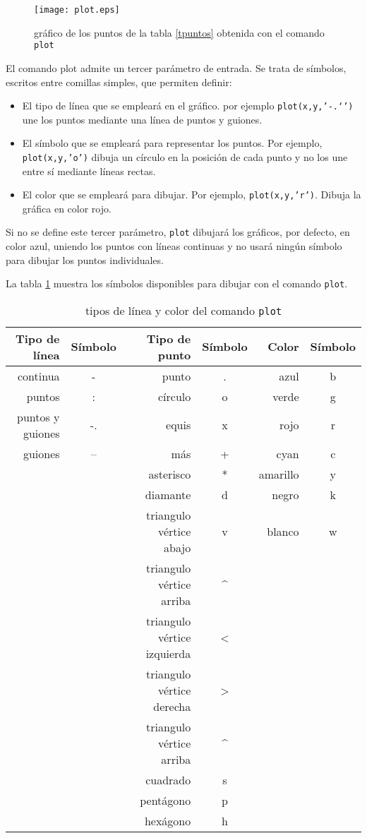 \begin{figure}[h]
\centering
\texttt{[image: plot.eps]}
\caption{gráfico de los puntos de la tabla \ref{tpuntos} obtenida con el comando \texttt{plot}}
\label{fig:plot}
\end{figure}
El comando plot admite un tercer parámetro de entrada. Se trata de símbolos, escritos entre comillas simples, que permiten definir: 
\begin{itemize}
\item El tipo de línea que se empleará en el gráfico. por ejemplo \texttt{plot(x,y,'-.`')} une los puntos mediante una línea de puntos y guiones.
\item El símbolo que se empleará para representar los puntos. Por ejemplo, \texttt{plot(x,y,'o')} dibuja un círculo en la posición de cada punto y no los une entre sí mediante líneas rectas.
\item El color que se empleará para dibujar. Por ejemplo, \texttt{plot(x,y,'r')}. Dibuja la gráfica en color rojo.
\end{itemize}

Si no se define este tercer parámetro, \texttt{plot} dibujará los gráficos, por defecto, en color azul, uniendo los puntos con líneas continuas y no usará ningún símbolo para dibujar los puntos individuales.
 
La tabla \ref{tcolor} muestra los símbolos disponibles para dibujar con el comando \texttt{plot}.

\begin{table}[h]
\caption{tipos de línea y color del comando \texttt{plot}}
\centering
\begin{tabular}{rc|rc|rc}
Tipo de línea&Símbolo&Tipo de punto& Símbolo &Color&Símbolo\\ 
\hline
continua&-&punto&.&azul&b\\
puntos&:&círculo&o&verde&g\\
puntos y guiones&-.&equis&x&rojo&r\\
guiones&--&más&+&cyan&c\\
&&asterisco&*&amarillo&y\\
&&diamante&d&negro&k\\
&&triangulo vértice abajo&v&blanco&w\\
&&triangulo vértice arriba&\^{}&&\\
&&triangulo vértice izquierda&\textless&&\\
&&triangulo vértice derecha&\textgreater&&\\
&&triangulo vértice arriba&\^{}&&\\
&&cuadrado&s&&\\
&&pentágono&p&&\\
&&hexágono&h&\\
\hline
\end{tabular}
\label{tcolor}
\end{table} 

